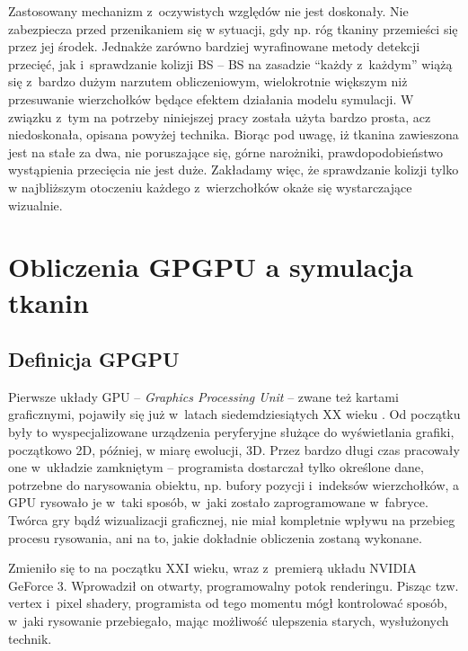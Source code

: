 				Zastosowany mechanizm z~oczywistych względów nie jest doskonały. Nie zabezpiecza przed przenikaniem się w sytuacji, gdy np. róg tkaniny przemieści się przez jej środek. Jednakże zarówno bardziej wyrafinowane metody detekcji przecięć, jak i~sprawdzanie kolizji BS -- BS na zasadzie ``każdy z~każdym'' wiążą się z~bardzo dużym narzutem obliczeniowym, wielokrotnie większym niż przesuwanie wierzchołków będące efektem działania modelu symulacji. W związku z~tym na potrzeby niniejszej pracy została użyta bardzo prosta, acz niedoskonała, opisana powyżej technika. Biorąc pod uwagę, iż tkanina zawieszona jest na stałe za dwa, nie poruszające się, górne narożniki, prawdopodobieństwo wystąpienia przecięcia nie jest duże. Zakładamy więc, że sprawdzanie kolizji tylko w najbliższym otoczeniu każdego z~wierzchołków okaże się wystarczające wizualnie.
			
	\section{Obliczenia GPGPU a symulacja tkanin}
	\label{t:teoria:gpu}
	
		\subsection{Definicja GPGPU}
		\label{t:teoria:gpu:gpgpu}
		
		Pierwsze układy GPU -- \emph{Graphics Processing Unit} -- zwane też kartami graficznymi, pojawiły się już w~latach siedemdziesiątych XX wieku \cite{gpu_wiki}. Od początku były to wyspecjalizowane urządzenia peryferyjne służące do wyświetlania grafiki, początkowo 2D, później, w miarę ewolucji, 3D. Przez bardzo długi czas pracowały one w~układzie zamkniętym -- programista dostarczał tylko określone dane, potrzebne do narysowania obiektu, np. bufory pozycji i~indeksów wierzchołków, a GPU rysowało je w~taki sposób, w~jaki zostało zaprogramowane w~fabryce. Twórca gry bądź wizualizacji graficznej, nie miał kompletnie wpływu na przebieg procesu rysowania, ani na to, jakie dokładnie obliczenia zostaną wykonane. 
		
		Zmieniło się to na początku XXI wieku, wraz z~premierą układu NVIDIA GeForce 3. Wprowadził on otwarty, programowalny potok renderingu. Pisząc tzw. vertex i~pixel shadery, programista od tego momentu mógł kontrolować sposób, w~jaki rysowanie przebiegało, mając możliwość ulepszenia starych, wysłużonych technik. 
		
